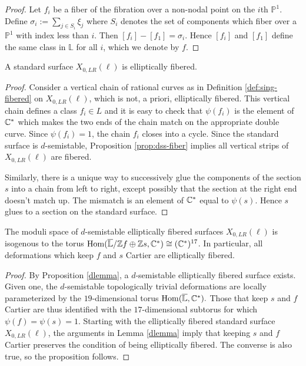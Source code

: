 \documentclass[table,x11names]{amsart}
\begin{document}
\begin{proof} Let $f_i$ be a fiber of the fibration over a
non-nodal point on the $i$th $\mathbb{P}^1$.
Define $\sigma_i :=\sum_{j\in S_i } \xi_j $ where $S_i$ denotes
the set of components which fiber over a $\mathbb{P}^1$
with index less than $i$. Then $[f_i]-[f_1] = \sigma_i$. Hence $[f_i]$ and $[f_1]$
define the same class in $\mathbb{L}$ for all $i$, which we denote by $f$. \end{proof}

\begin{lemma}\label{dlemma} A standard surface $X_{0,LR}(\ell)$ is elliptically fibered. \end{lemma} 

\begin{proof} Consider a vertical chain of rational curves as in
Definition \ref{def:sing-fibered} on $X_{0,LR}(\ell)$,
which is not, a priori, elliptically fibered. This vertical chain defines a class $f_i\in L$
and it is easy to check that $\psi(f_i)$ is the element of $\mathbb{C}^*$ which makes the two ends
of the chain match on the appropriate double curve. Since $\psi(f_i)=1$,
the chain $f_i$ closes into a cycle.
Since the standard surface is $d$-semistable,
Proposition \ref{prop:dss-fiber} implies all vertical strips of $X_{0,LR}(\ell)$ are fibered.

Similarly, there is a unique way to successively glue the components of the section $s$
into a chain from left to right, except possibly that the section at the right end doesn't match up.
The mismatch is an element of $\mathbb{C}^*$ equal to $\psi(s)$. Hence $s$ glues to a section
on the standard surface. \end{proof} 

\begin{proposition}\label{dssinput} The moduli space of $d$-semistable elliptically fibered
surfaces $X_{0,LR}(\ell)$ is isogenous to the torus
$\operatorname{Hom}(\overline{\mathbb{L}}/\mathbb{Z} f\oplus \mathbb{Z} s,\mathbb{C}^*)\cong (\mathbb{C}^*)^{17}$. In particular,
all deformations which keep $f$ and $s$ Cartier are elliptically fibered. \end{proposition} 

\begin{proof} By Proposition \ref{dlemma}, a $d$-semistable elliptically fibered surface exists.
Given one, the $d$-semistable 
topologically trivial deformations
are locally parameterized by the $19$-dimensional torus
$\operatorname{Hom}(\overline{\mathbb{L}},\mathbb{C}^*).$
Those that keep $s$ and $f$ Cartier are thus identified with the $17$-dimensional
subtorus for which $\psi(f)=\psi(s)=1$. Starting with the elliptically fibered
standard surface $X_{0,LR}(\ell)$, the arguments in Lemma \ref{dlemma} imply that
keeping $s$ and $f$ Cartier preserves the condition of being elliptically fibered. The
converse is also true, so the proposition follows.
\end{proof}
\end{document}
